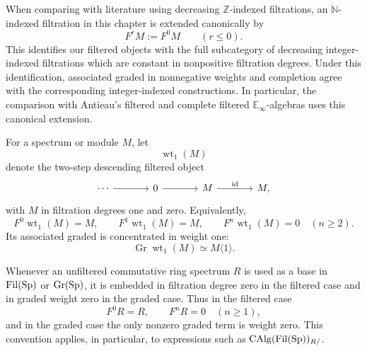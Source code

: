 \begin{convention}
\label{conv:nonnegative-filtered-indexing}
When comparing with literature using decreasing \(\mathbb Z\)-indexed
filtrations, an \(\mathbb N\)-indexed filtration in this chapter is extended
canonically by
\[
    F^rM:=F^0M
    \qquad(r\leq0).
\]
This identifies our filtered objects with the full subcategory of decreasing
integer-indexed filtrations which are constant in nonpositive filtration degrees. Under
this identification, associated graded in nonnegative weights and completion
agree with the corresponding integer-indexed constructions. In particular, the comparison with
Antieau's filtered and complete filtered \(\mathbb E_\infty\)-algebras uses
this canonical extension.
\end{convention}

\begin{definition}
\label{def:weight-one-filtered-module}
For a spectrum or module \(M\), let
\[
    \operatorname{wt}_1(M)
\]
denote the two-step descending filtered object
\[
\begin{tikzcd}[column sep=large]
    \cdots \arrow[r]
        & 0 \arrow[r]
        & M \arrow[r,"\mathrm{id}"]
        & M ,
\end{tikzcd}
\]
with \(M\) in filtration degrees one and zero. Equivalently,
\[
    F^0\operatorname{wt}_1(M)=M,
    \qquad
    F^1\operatorname{wt}_1(M)=M,
    \qquad
    F^n\operatorname{wt}_1(M)=0
    \quad(n\geq2).
\]
Its associated graded is concentrated in weight one:
\[
    \operatorname{Gr}\operatorname{wt}_1(M)\simeq M\langle1\rangle.
\]
\end{definition}

\begin{convention}
\label{conv:filtered-base-weight-zero}
Whenever an unfiltered commutative ring spectrum \(R\) is used as a base in
\(\operatorname{Fil}(\operatorname{Sp})\) or \(\operatorname{Gr}(\operatorname{Sp})\), it is embedded in
filtration degree zero in the filtered case and in graded weight zero in the graded
case. Thus in the filtered case
\[
    F^0R=R,
    \qquad
    F^nR=0\quad(n\geq1),
\]
and in the graded case the only nonzero graded term is weight zero. This
convention applies, in particular, to expressions such as
\(\operatorname{CAlg}(\operatorname{Fil}(\operatorname{Sp}))_{R/}\).
\end{convention}


